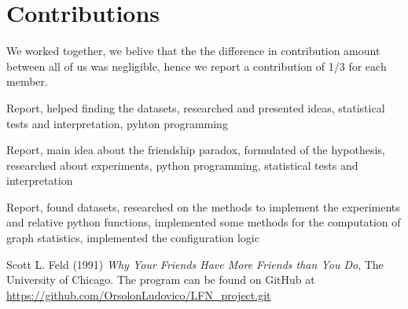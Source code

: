 \documentclass{article}
\begin{document}
\section*{Contributions}
We worked together, we belive that the the difference in contribution amount between all of us was negligible, hence we report a contribution of 1/3 for each member.
\begin{description}[font=\normalfont\itshape]
    \item[Lavorati Ippolito:] Report, helped finding the datasets, researched and presented ideas, statistical tests and interpretation, pyhton programming
    \item[Orsolon Ludovico:] Report, main idea about the friendship paradox, formulated of the hypothesis, researched about experiments, python programming, statistical tests and interpretation
    \item[Stefani Patrizia:] Report, found datasets, researched on the methods to implement the experiments and relative python functions, implemented some methods for the computation of graph statistics, implemented the configuration logic
\end{description}
\begin{thebibliography}{9}
Scott L. Feld (1991) \emph{Why Your Friends Have More Friends
than You Do}, The University of Chicago.
The program can be found on GitHub at \url{https://github.com/OrsolonLudovico/LFN_project.git}
\end{thebibliography}
\end{document}
